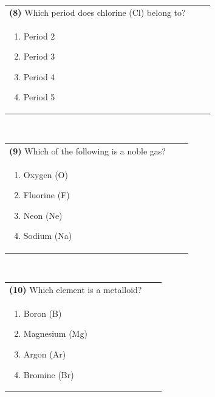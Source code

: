 \documentclass{article}
\begin{document}
\vspace{0.5cm}
\noindent \begin{tabular}{|p{0.9\linewidth}|}
\hline
\vspace{0.2cm}
\textbf{(8)} Which period does chlorine (Cl) belong to? \\
\begin{minipage}[t]{0.85\linewidth}
\begin{enumerate}[label=\alph*.]
\item Period 2
\item Period 3
\item Period 4
\item Period 5
\end{enumerate}
\end{minipage}\\
\hline
\end{tabular}
\\
 \newpage 
\noindent \begin{tabular}{|p{0.9\linewidth}|}
\hline
\vspace{0.2cm}
\textbf{(9)} Which of the following is a noble gas? \\
\begin{minipage}[t]{0.85\linewidth}
\begin{enumerate}[label=\alph*.]
\item Oxygen (O)
\item Fluorine (F)
\item Neon (Ne)
\item Sodium (Na)
\end{enumerate}
\end{minipage}\\
\hline
\end{tabular}
\\

\vspace{0.5cm}
\noindent \begin{tabular}{|p{0.9\linewidth}|}
\hline
\vspace{0.2cm}
\textbf{(10)} Which element is a metalloid? \\
\begin{minipage}[t]{0.85\linewidth}
\begin{enumerate}[label=\alph*.]
\item Boron (B)
\item Magnesium (Mg)
\item Argon (Ar)
\item Bromine (Br)
\end{enumerate}
\end{minipage}\\
\hline
\end{tabular}
\\
\end{document}
